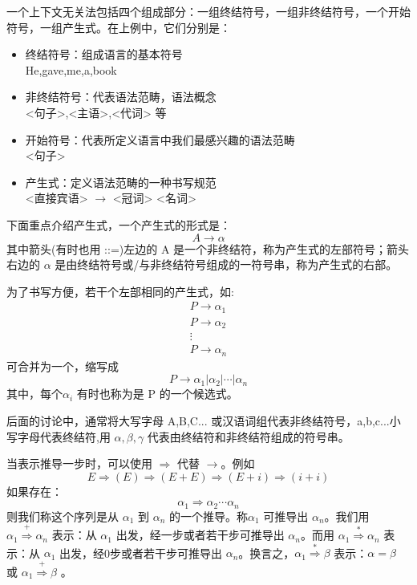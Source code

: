 一个上下文无关法包括四个组成部分：一组终结符号，一组非终结符号，一个开始符号，一组产生式。在上例中，它们分别是：

\begin{itemize}
    \item 终结符号：组成语言的基本符号 \\
    He,gave,me,a,book
    \item 非终结符号：代表语法范畴，语法概念 \\
    <句子>,<主语>,<代词> 等 
    \item 开始符号：代表所定义语言中我们最感兴趣的语法范畴 \\
    <句子>
    \item 产生式：定义语法范畴的一种书写规范\\
    <直接宾语> $\rightarrow$ <冠词> <名词>
\end{itemize}

下面重点介绍产生式，一个产生式的形式是：
\[A \rightarrow \alpha\]
其中箭头(有时也用 ::=)左边的 A 是一个非终结符，称为产生式的左部符号；箭头右边的 $\alpha$ 是由终结符号或/与非终结符号组成的一符号串，称为产生式的右部。

为了书写方便，若干个左部相同的产生式，如:
\begin{equation}
    \begin{aligned}
        P \rightarrow \alpha_1 \\
        P \rightarrow \alpha_2 \\
        \vdots \\
        P \rightarrow \alpha_n \nonumber
    \end{aligned}
\end{equation}
可合并为一个，缩写成
\[ P \rightarrow \alpha_1 | \alpha_2 | \cdots | \alpha_n \]
其中，每个$\alpha_i$ 有时也称为是 P 的一个候选式。

后面的讨论中，通常将大写字母 A,B,C... 或汉语词组代表非终结符号，a,b,c...小写字母代表终结符,用 $\alpha,\beta,\gamma$ 代表由终结符和非终结符组成的符号串。

当表示推导一步时，可以使用 $\Rightarrow$ 代替 $\rightarrow$。例如 
\[ E \Rightarrow (E) \Rightarrow (E+E) \Rightarrow (E+i) \Rightarrow (i+i) \]
如果存在：
\[ \alpha_1 \Rightarrow \alpha_2 \cdots \alpha_n \]
则我们称这个序列是从 $\alpha_1$ 到 $\alpha_n$ 的一个推导。称$\alpha_1$ 可推导出 $\alpha_n$。我们用 $\alpha_1 \stackrel{+}{\Rightarrow} \alpha_n$ 表示：从 $\alpha_1$ 出发，经一步或者若干步可推导出 $\alpha_n$。而用 $\alpha_1 \stackrel{*}{\Rightarrow} \alpha_n$ 表示：从 $\alpha_1$ 出发，经0步或者若干步可推导出 $\alpha_n$。换言之，$\alpha_1 \stackrel{*}{\Rightarrow} \beta$ 表示：$\alpha = \beta$ 或 $\alpha_1 \stackrel{+}{\Rightarrow} \beta$ 。

